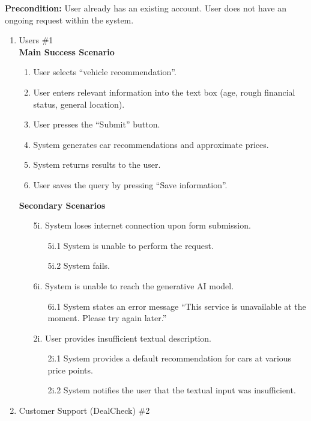 \documentclass[]{article}
\begin{document}
\begin{enumerate}[{\bf {BE}1.}]
        {\bf Precondition:} User already has an existing account. User does not have an ongoing request within the system.
		\begin{enumerate}[{\bf VP1.}]
		  \item Users \#1 \\
			\textbf{Main Success Scenario}
			\begin{enumerate}[1.]
			  \item User selects ``vehicle recommendation''.
			  \item User enters relevant information into the text box (age, rough financial status, general location).
			  \item User presses the ``Submit'' button.
			  \item System generates car recommendations and approximate prices.
			  \item System returns results to the user.
			  \item User saves the query by pressing ``Save information''.
			\end{enumerate}
			\textbf{Secondary Scenarios}
			\begin{enumerate}
			  \item[5i.] System loses internet connection upon form submission.
			  \begin{enumerate}
				\item[5i.1] System is unable to perform the request.
				\item[5i.2] System fails.
			  \end{enumerate}
			  \item[6i.] System is unable to reach the generative AI model.
			  \begin{enumerate}
				\item[6i.1] System states an error message ``This service is unavailable at the moment. Please try again later.''
			  \end{enumerate}
			  \item[2i.] User provides insufficient textual description.
			  \begin{enumerate}
				\item[2i.1] System provides a default recommendation for cars at various price points.
				\item[2i.2] System notifies the user that the textual input was insufficient.
			  \end{enumerate}
			\end{enumerate}
		  \item Customer Support (DealCheck) \#2
			\begin{enumerate}

\end{enumerate}
\end{enumerate}
\end{enumerate}
\end{document}
